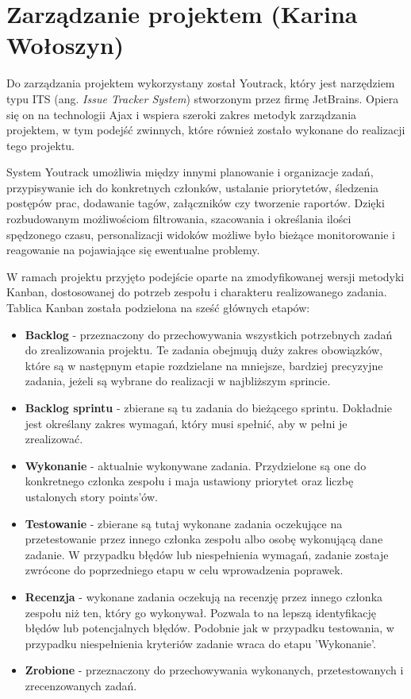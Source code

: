 \section{Zarządzanie projektem (Karina Wołoszyn)}

Do zarządzania projektem wykorzystany został Youtrack, który jest narzędziem typu ITS (ang. \textit{Issue Tracker System}) stworzonym przez firmę JetBrains. Opiera się on na technologii Ajax i wspiera szeroki zakres metodyk zarządzania projektem, w tym podejść zwinnych, które również zostało wykonane do realizacji tego projektu.

System Youtrack umożliwia między innymi planowanie i organizacje zadań, przypisywanie ich do konkretnych członków, ustalanie priorytetów, śledzenia postępów prac, dodawanie tagów, załączników czy tworzenie raportów. Dzięki rozbudowanym możliwościom filtrowania, szacowania i określania ilości spędzonego czasu, personalizacji widoków możliwe było bieżące monitorowanie i reagowanie na pojawiające się ewentualne problemy.

W ramach projektu przyjęto podejście oparte na zmodyfikowanej wersji metodyki Kanban, dostosowanej do potrzeb zespołu i charakteru realizowanego zadania. Tablica Kanban została podzielona na sześć głównych etapów:

\begin{itemize}
    \item \textbf{Backlog} - przeznaczony do przechowywania wszystkich potrzebnych zadań do zrealizowania projektu. Te zadania obejmują duży zakres obowiązków, które są w następnym etapie rozdzielane na mniejsze, bardziej precyzyjne zadania, jeżeli są wybrane do realizacji w najbliższym sprincie.
    \item \textbf{Backlog sprintu} - zbierane są tu zadania do bieżącego sprintu. Dokładnie jest określany zakres wymagań, który musi spełnić, aby w pełni je zrealizować.
    \item \textbf{Wykonanie} - aktualnie wykonywane zadania. Przydzielone są one do konkretnego członka zespołu i maja ustawiony priorytet oraz liczbę ustalonych story points'ów.
    \item \textbf{Testowanie} - zbierane są tutaj wykonane zadania oczekujące na przetestowanie przez innego członka zespołu albo osobę wykonującą dane zadanie. W przypadku błędów lub niespełnienia wymagań, zadanie zostaje zwrócone do poprzedniego etapu w celu wprowadzenia poprawek.
    \item \textbf{Recenzja} - wykonane zadania oczekują na recenzję przez innego członka zespołu niż ten, który go wykonywał. Pozwala to na lepszą identyfikację błędów lub potencjalnych błędów. Podobnie jak w przypadku testowania, w przypadku niespełnienia kryteriów zadanie wraca do etapu 'Wykonanie'.
    \item \textbf{Zrobione} - przeznaczony do przechowywania wykonanych, przetestowanych i zrecenzowanych zadań.
\end{itemize}

